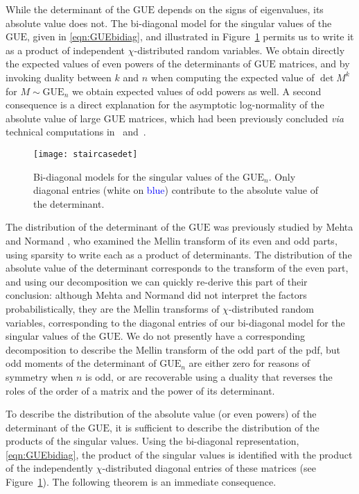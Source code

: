 \documentclass[pdftex, oneside, 10pt, letterpaper]{amsart}
\theoremstyle{plain}
\theoremstyle{definition}
\theoremstyle{remark}
\begin{document}
While the determinant of the {\ensuremath{\mathrm{GUE}}}{} depends on the signs of
eigenvalues, its absolute value does not.  The bi-diagonal model for
the singular values of the {\ensuremath{\mathrm{GUE}}}{}, given in \eqref{eqn:GUEbidiag}, and
illustrated in Figure~\ref{fig:staircasedet} permits us to write it as
a product of independent $\chi$-distributed random variables.  We
obtain directly the expected values of even powers of the determinants
of {\ensuremath{\mathrm{GUE}}}{} matrices, and by invoking duality between $k$ and $n$ when
computing the expected value of $\det{M^k}$ for $M\sim{\ensuremath{\mathrm{GUE}}}_n$ we
obtain expected values of odd powers as well.  A second consequence is
a direct explanation for the asymptotic log-normality of the absolute
value of large {\ensuremath{\mathrm{GUE}}}{} matrices, which had been previously concluded
\emph{via} technical computations in~\cite{D-LC} and~\cite{TV}.

\begin{figure}[!bp]
\texttt{[image: staircasedet]}
\caption{Bi-diagonal models for the singular values of the ${\ensuremath{\mathrm{GUE}}}{}_n$.
  Only diagonal entries (white on \textcolor{Blue}{blue}) contribute
  to the absolute value of the determinant.}\label{fig:staircasedet}
\end{figure}

The distribution of the determinant of the {\ensuremath{\mathrm{GUE}}}{} was previously
studied by Mehta and Normand \cite{MeNo}, who examined the Mellin
transform of its even and odd parts, using sparsity to write each as a
product of determinants.  The distribution of the absolute value of
the determinant corresponds to the transform of the even part, and
using our decomposition we can quickly re-derive this part of their
conclusion: although Mehta and Normand did not interpret the factors
probabilistically, they are the Mellin transforms of
$\chi$-distributed random variables, corresponding to the diagonal
entries of our bi-diagonal model for the singular values of the
{\ensuremath{\mathrm{GUE}}}{}.  We do not presently have a corresponding decomposition to
describe the Mellin transform of the odd part of the pdf, but odd
moments of the determinant of ${\ensuremath{\mathrm{GUE}}}{}_n$ are either zero for reasons
of symmetry when $n$ is odd, or are recoverable using a duality that
reverses the roles of the order of a matrix and the power of its
determinant.

To describe the distribution of the absolute value (or even powers) of
the determinant of the {\ensuremath{\mathrm{GUE}}}{}, it is sufficient to describe the
distribution of the products of the singular values.  Using the
bi-diagonal representation, \eqref{eqn:GUEbidiag}, the product of the
singular values is identified with the product of the independently
$\chi$-distributed diagonal entries of these matrices (see
Figure~\ref{fig:staircasedet}).  The following theorem is an immediate
consequence.
\end{document}
